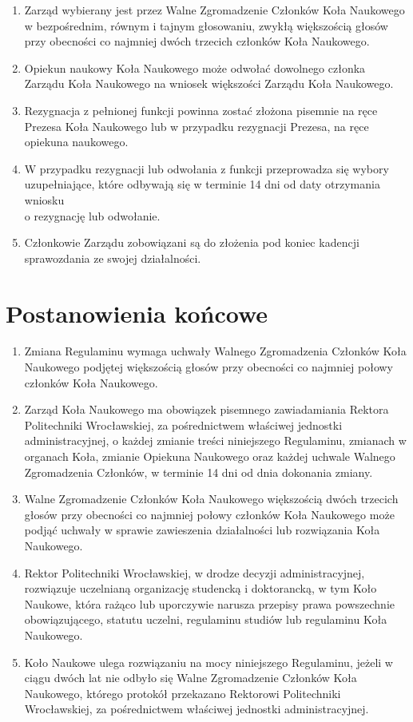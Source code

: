 \documentclass[12pt,a4paper]{article}
\begin{document}
\begin{enumerate}
        \item Zarząd wybierany jest przez Walne Zgromadzenie Członków Koła Naukowego w bezpośrednim, równym i tajnym głosowaniu, zwykłą większością głosów przy obecności co najmniej dwóch trzecich członków Koła Naukowego.
        \item Opiekun naukowy Koła Naukowego może odwołać dowolnego członka Zarządu Koła Naukowego na wniosek większości Zarządu Koła Naukowego.
        \item Rezygnacja z pełnionej funkcji powinna zostać złożona pisemnie na ręce Prezesa Koła Naukowego lub w przypadku rezygnacji Prezesa, na ręce opiekuna naukowego.
        \item W przypadku rezygnacji lub odwołania z funkcji przeprowadza się wybory uzupełniające, które odbywają się w terminie 14 dni od daty otrzymania wniosku \\ o rezygnację lub odwołanie.
        \item Członkowie Zarządu zobowiązani są do złożenia pod koniec kadencji sprawozdania ze swojej działalności.
    \end{enumerate}


\section{Postanowienia końcowe}
    \begin{enumerate}
        \item Zmiana Regulaminu wymaga uchwały Walnego Zgromadzenia Członków Koła Naukowego podjętej większością głosów przy obecności co najmniej połowy członków Koła Naukowego.
        \item Zarząd Koła Naukowego ma obowiązek pisemnego zawiadamiania Rektora Politechniki Wrocławskiej, za pośrednictwem właściwej jednostki administracyjnej, o każdej zmianie treści niniejszego Regulaminu, zmianach w organach Koła, zmianie Opiekuna Naukowego oraz każdej uchwale Walnego Zgromadzenia Członków, w terminie 14 dni od dnia dokonania zmiany. 
        \item Walne Zgromadzenie Członków Koła Naukowego większością dwóch trzecich głosów przy obecności co najmniej połowy członków Koła Naukowego może podjąć uchwały w sprawie zawieszenia działalności lub rozwiązania Koła Naukowego.
        \item Rektor Politechniki Wrocławskiej, w drodze decyzji administracyjnej, rozwiązuje uczelnianą organizację studencką i doktorancką, w tym Koło Naukowe, która rażąco lub uporczywie narusza przepisy prawa powszechnie obowiązującego, statutu uczelni, regulaminu studiów lub regulaminu Koła Naukowego.
        \item Koło Naukowe ulega rozwiązaniu na mocy niniejszego Regulaminu, jeżeli w ciągu dwóch lat nie odbyło się Walne Zgromadzenie Członków Koła Naukowego, którego protokół przekazano Rektorowi Politechniki Wrocławskiej, za pośrednictwem właściwej jednostki administracyjnej.
    \end{enumerate}
\end{document}
